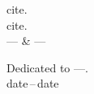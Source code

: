 \thispagestyle{empty}
{}

\vspace*{3cm}

\begin{center}
    cite. \\
    cite. \\ \medskip
    --- \& ---    
\end{center}

\medskip

\begin{center}
    Dedicated to ---. \\ \smallskip
    date\,--\,date
\end{center}